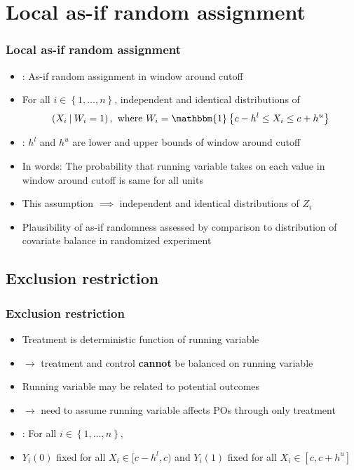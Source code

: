 \documentclass[table, xcolor = {dvipsnames}, 9pt]{beamer}
\newcommand\given[1][]{\:#1\vert\:}
\theoremstyle{plain}
\newcommand{\bh}[1]{{\color{blue}{#1}}}
\newcommand{\mh}[1]{{\color{magenta}{#1}}}
\begin{document}
\section{Local as-if random assignment}
\begin{frame}
\frametitle{Local as-if random assignment} 
\vfill
\begin{itemize} \vfill
\item \bh{Key assumption}: As-if random assignment in window around cutoff \vfill
\item[] For all $i \in \left\{1, \ldots , n\right\}$, independent and identical distributions of \vfill
\begin{align*}
\left(X_i \given W_i = 1\right), \text{ where } W_i = \mathbbm{1}\left\{c - h^l \leq X_i \leq c + h^u\right\}
\end{align*} \vfill
\item \mh{Note}: $h^l$ and $h^u$ are lower and upper bounds of window around cutoff \vfill
\item In words: The probability that running variable takes on each value in window around cutoff is same for all units \vfill
\item[] This assumption $\implies$ independent and identical distributions of $Z_i$ \vfill
\item Plausibility of as-if randomness assessed by comparison to distribution of covariate balance in randomized experiment \citep{hansenbowers2008} \vfill
\end{itemize} \vfill
\end{frame}
\subsection{Exclusion restriction}
\begin{frame}
\frametitle{Exclusion restriction} 
\vfill
\begin{itemize} \vfill
\item Treatment is deterministic function of running variable \vfill
\item[] $\rightarrow$ treatment and control \textbf{cannot} be balanced on running variable \vfill
\item Running variable may be related to potential outcomes \vfill
\item[] $\rightarrow$ need to assume running variable affects POs through only treatment \vfill
\item \bh{Exclusion restriction}: For all $i \in \left\{1, \ldots , n\right\}$, \vfill 
\item[] $Y_i(0)$ fixed for all $X_i \in [c - h^l, c)$ and $Y_i(1)$ fixed for all $X_i \in [c, c + h^u]$ \vfill
\end{itemize} \vfill
\end{frame}
\end{document}
